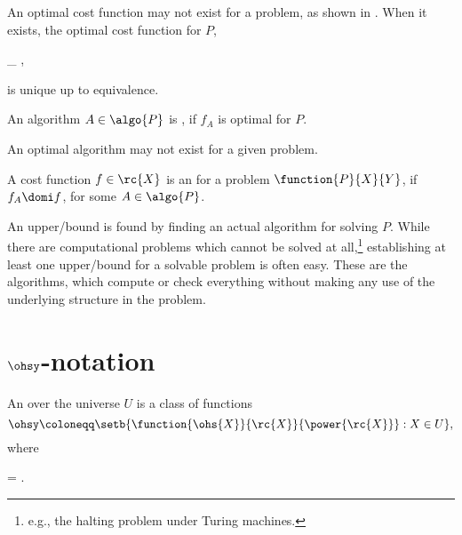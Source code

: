 \documentclass[b5paper, english, oneside]{memoir}
\begin{document}
\begin{note}
An optimal cost function may not exist for a problem, as shown in . When it exists, the optimal cost function for $P$,
\begin{eqs}
\inf_{\domi} ,
\end{eqs}
is unique up to equivalence. 
\end{note}

\begin{definition}
An algorithm $A \in \algo{P}$ is , if $f_A$ is optimal for $P$.
\end{definition}

\begin{note}
An optimal algorithm may not exist for a given problem.
\end{note}

\begin{definition}
A cost function $f \in \rc{X}$ is an  for a problem $\function{P}{X}{Y}$, if $f_A \domi f$, for some $A \in \algo{P}$. 
\end{definition}

An upper\-/bound is found by finding an actual algorithm for solving $P$. While there are computational problems which cannot be solved at all,\footnote{e.g., the halting problem under Turing machines.} establishing at least one upper\-/bound for a solvable problem is often easy. These are the  algorithms, which compute or check everything without making any use of the underlying structure in the problem. 

\section{\texorpdfstring{$\ohsy$}{O}-notation}

\begin{definition}
An  over the universe $U$ is a class of functions
\begin{equation}
\ohsy \coloneqq \setb{\function{\ohs{X}}{\rc{X}}{\power{\rc{X}}} : X \in U},
\end{equation}
where
\begin{eqs}
 = .
\end{eqs}
\end{definition}
\end{document}
